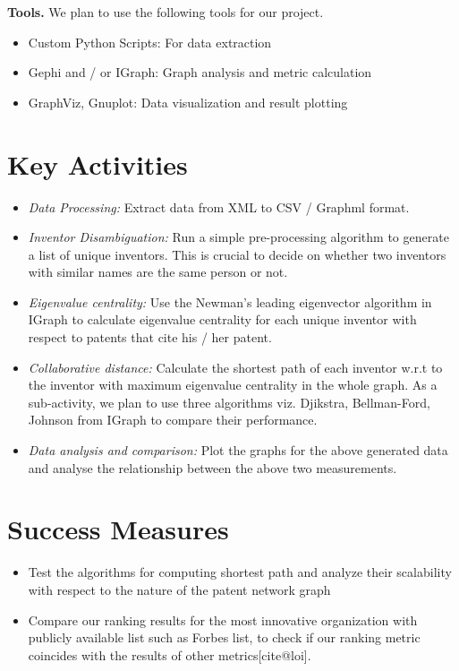 \documentclass[11pt]{article}
\renewcommand{\paragraph}{\vspace{3pt}\noindent\textbf}
\begin{document}
\paragraph{Tools.}
We plan to use the following tools for our project.
\begin{itemize}
\item Custom Python Scripts: For data extraction
\item Gephi and / or IGraph: Graph analysis and metric calculation
\item GraphViz, Gnuplot: Data visualization and result plotting 
\end{itemize}

\section{Key Activities}
\begin{itemize}
\item {\em Data Processing:} Extract data from XML to CSV / Graphml format.
\item {\em Inventor Disambiguation:} Run a simple pre-processing algorithm to generate a list of unique inventors.  This is crucial to decide on whether two inventors with similar names are the same person or not.
\item {\em Eigenvalue centrality:} Use the Newman's leading eigenvector algorithm in IGraph to calculate eigenvalue centrality for each unique inventor with respect to patents that cite his / her patent.
\item {\em Collaborative distance:} Calculate the shortest path of each inventor w.r.t to the inventor with maximum eigenvalue centrality in the whole graph. As a sub-activity, we plan to use three algorithms viz. Djikstra, Bellman-Ford, Johnson from IGraph to compare their performance.
\item {\em Data analysis and comparison:} Plot the graphs for the above generated data and analyse the relationship between the above two measurements.
\end{itemize}

\section{Success Measures} %
\begin{itemize}
\item Test the algorithms for computing shortest path and analyze their scalability with respect to the nature of the patent network graph
\item Compare our ranking results for the most innovative organization with publicly available list such as Forbes list, to check if our ranking metric coincides with the results of other metrics[cite@loi].
\end{itemize}
\end{document}
